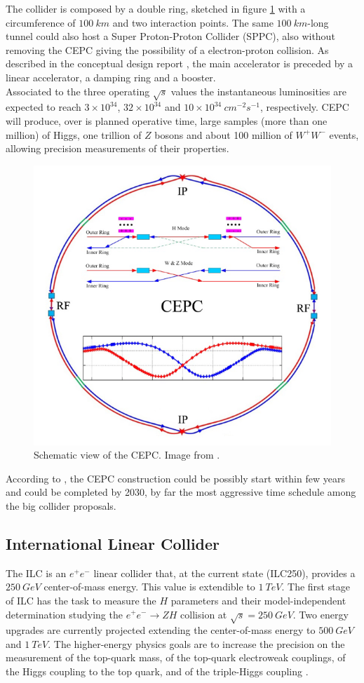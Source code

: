 The collider is composed by a double ring, sketched in figure \ref{fig:CEPC} with a circumference of $100\ km$ and two interaction points. The same $100\ km$-long tunnel could also host a Super Proton-Proton Collider (SPPC), also without removing the CEPC giving the possibility of a electron-proton collision. As described in the conceptual design report \cite{CEPC_design1, CEPC_design2}, the main accelerator is preceded by a linear accelerator, a damping ring and a booster.\\
Associated to the three operating $\sqrt{s}$ values the instantaneous luminosities are expected to reach $3 \times 10^{34}$, $32 \times 10^{34}$ and $10 \times 10^{34}\ cm^{-2}s^{-1}$, respectively.
CEPC will produce, over is planned operative time, large samples (more than one million) of Higgs, one trillion of $Z$ bosons and about 100 million of $W^+W^-$ events, allowing precision measurements of their properties.\\

\begin{figure}
	\centering
	\includegraphics[width=.7\textwidth]{IMG/Cap1/CEPC.png}
	\caption{ Schematic view of the CEPC. Image from \cite{CEPC_design2}.}
	\label{fig:CEPC}
\end{figure}

According to \cite{CEPC_schedule}, the CEPC construction could be possibly start within few years and could be completed by 2030, by far the most aggressive time schedule among the big collider proposals.

\subsection*{International Linear Collider}
The ILC is an $e^+e^-$ linear collider that, at the current state (ILC250), provides a $250\ GeV$ center-of-mass energy. This value is extendible to $1\ TeV$.
The first stage of ILC has the task to measure the $H$ parameters and their model-independent determination studying the $e^+e^- \rightarrow ZH$ collision at $\sqrt{s}= 250\ GeV$.
Two energy upgrades are currently projected extending the center-of-mass energy to $500\ GeV$ and $1\ TeV$.
The higher-energy physics goals are to increase the precision on the measurement of the top-quark mass, of the top-quark electroweak couplings, of the Higgs coupling to the top quark, and of the triple-Higgs coupling \cite{ILC_global_project}.\\


